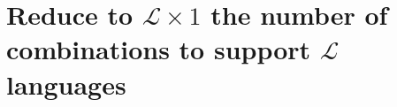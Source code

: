 \section{Reduce to $\mathcal{L} \times 1$ the number of combinations to support $\mathcal{L}$ languages}


